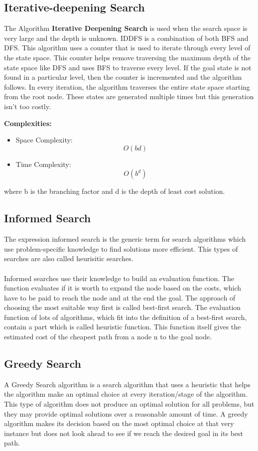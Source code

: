 \documentclass[11pt]{article}
\begin{document}
\subsection{Iterative-deepening Search}
The Algorithm \textbf{Iterative Deepening Search} is used when the search space is very large and the depth is unknown. IDDFS is a combination of both BFS and DFS. This algorithm uses a counter that is used to iterate through every level of the state space. This counter helps remove traversing the maximum depth of the state space like DFS and uses BFS to traverse every level. If the goal state is not found in a particular level, then the counter is incremented and the algorithm follows. In every iteration, the algorithm traverses the entire state space starting from the root node. These states are generated multiple times but this generation isn't too costly. 

\textbf{Complexities:}
\begin{itemize}
\item Space Complexity: \[O(bd)\]
\item Time Complexity: \[ O(b^d)\]
\end{itemize}
where b is the branching factor and d is the depth of least cost solution.

\subsection{Informed Search}
The expression informed search is the generic term for search algorithms which use problem-specific knowledge to find solutions more efficient. This types of searches are also called heurisitic searches. \\
\\
Informed searches use their knowledge to build an evaluation function. The function evaluates if it is worth to expand the node based on the costs, which have to be paid to reach the node and at the end the goal. The approach of choosing the most suitable way first is called best-first search. The evaluation function of lots of algorithms, which fit into the definition of a best-first search, contain a part which is called heuristic function. This function itself gives the estimated cost of the cheapest path from a node n to the goal node.

\subsection{Greedy Search}
A Greedy Search algorithm is a search algorithm that uses a heuristic that helps the algorithm make an optimal choice at every iteration/stage of the algorithm. This type of algorithm does not produce an optimal solution for all problems, but they may provide optimal solutions over a reasonable amount of time. A greedy algorithm makes its decision based on the most optimal choice at that very instance but does not look ahead to see if we reach the desired goal in its best path. 
\end{document}
